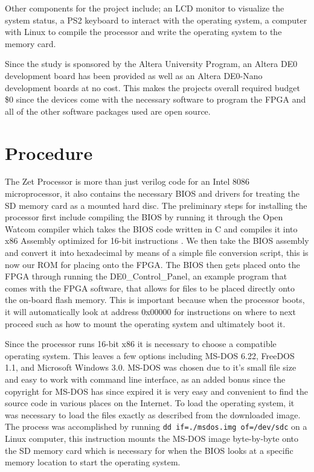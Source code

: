 \documentclass[11pt,peerreviewca]{IEEEtran}
\begin{document}
Other components for the project include; an LCD monitor to visualize the system status, a PS2 keyboard to interact with the operating system, a computer with Linux to compile the processor and write the operating system to the memory card.

Since the study is sponsored by the Altera University Program, an Altera DE0 development board has been provided as well as an Altera DE0-Nano development boards at no cost. This makes the projects overall required budget \$0 since the devices come with the necessary software to program the FPGA and all of the other software packages used are open source.

\section{Procedure}
The Zet Processor is more than just verilog code for an Intel 8086 microprocessor, it also contains the necessary BIOS and drivers for treating the SD memory card as a mounted hard disc. The preliminary steps for installing the processor first include compiling the BIOS by running it through the Open Watcom compiler which takes the BIOS code written in C and compiles it into x86 Assembly optimized for 16-bit instructions \cite{Watcom}. We then take the BIOS assembly and convert it into hexadecimal by means of a simple file conversion script, this is now our ROM for placing onto the FPGA. The BIOS then gets placed onto the FPGA through running the DE0\_Control\_Panel, an example program that comes with the FPGA software, that allows for files to be placed directly onto the on-board flash memory. This is important because when the processor boots, it will automatically look at address 0x00000 for instructions on where to next proceed such as how to mount the operating system and ultimately boot it. 

Since the processor runs 16-bit x86 it is necessary to choose a compatible operating system. This leaves a few options including MS-DOS 6.22, FreeDOS 1.1, and Microsoft Windows 3.0. MS-DOS was chosen due to it's small file size and easy to work with command line interface, as an added bonus since the copyright for MS-DOS has since expired it is very easy and convenient to find the source code in various places on the Internet. To load the operating system, it was necessary to load the files exactly as described from the downloaded image. The process was accomplished by running {\tt dd if=./msdos.img of=/dev/sdc} on a Linux computer, this instruction mounts the MS-DOS image byte-by-byte onto the SD memory card which is necessary for when the BIOS looks at a specific memory location to start the operating system.
\end{document}
